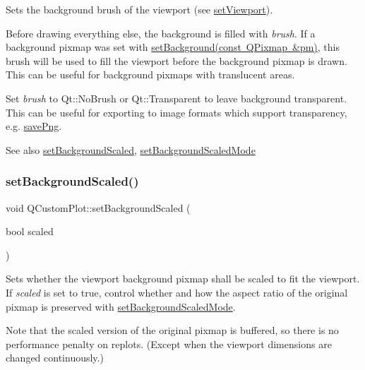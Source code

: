 Sets the background brush of the viewport (see \mbox{\hyperlink{class_q_custom_plot_a3f9bc4b939dd8aaba9339fd09f273fc4}{set\+Viewport}}).

Before drawing everything else, the background is filled with {\itshape brush}. If a background pixmap was set with \mbox{\hyperlink{class_q_custom_plot_a130358592cfca353ff3cf5571b49fb00}{set\+Background(const Q\+Pixmap \&pm)}}, this brush will be used to fill the viewport before the background pixmap is drawn. This can be useful for background pixmaps with translucent areas.

Set {\itshape brush} to Qt\+::\+No\+Brush or Qt\+::\+Transparent to leave background transparent. This can be useful for exporting to image formats which support transparency, e.\+g. \mbox{\hyperlink{class_q_custom_plot_ac92cc9256d12f354b40a4be4600b5fb9}{save\+Png}}.

\begin{DoxySeeAlso}{See also}
\mbox{\hyperlink{class_q_custom_plot_a36f0fa1317325dc7b7efea615ee2de1f}{set\+Background\+Scaled}}, \mbox{\hyperlink{class_q_custom_plot_a4c0eb4865b7949f62e1cb97db04a3de0}{set\+Background\+Scaled\+Mode}} 
\end{DoxySeeAlso}
\mbox{\label{class_q_custom_plot_a36f0fa1317325dc7b7efea615ee2de1f}} 
\subsubsection{\texorpdfstring{set\+Background\+Scaled()}{setBackgroundScaled()}}
{\footnotesize\ttfamily void Q\+Custom\+Plot\+::set\+Background\+Scaled (\begin{DoxyParamCaption}\item[{bool}]{scaled }\end{DoxyParamCaption})}

Sets whether the viewport background pixmap shall be scaled to fit the viewport. If {\itshape scaled} is set to true, control whether and how the aspect ratio of the original pixmap is preserved with \mbox{\hyperlink{class_q_custom_plot_a4c0eb4865b7949f62e1cb97db04a3de0}{set\+Background\+Scaled\+Mode}}.

Note that the scaled version of the original pixmap is buffered, so there is no performance penalty on replots. (Except when the viewport dimensions are changed continuously.)

